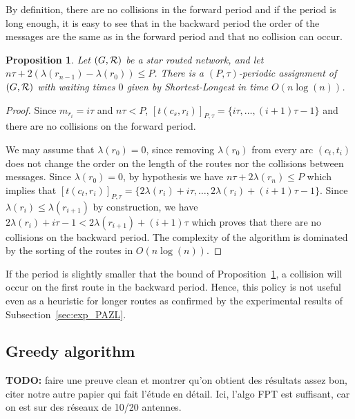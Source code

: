 \documentclass[10pt, conference, letterpaper]{IEEEtran}
\newtheorem{proposition}{Proposition}
\begin{document}
     By definition, there are no collisions in the forward period and if the period is long enough, 
     it is easy to see that in the backward period the order of the messages are the same as in the forward period and that no collision can occur. 
      
      
      \begin{proposition} Let $(G, {\cal R})$ be a star routed network, and let $n\tau + 2(\lambda(r_{n-1}) - \lambda(r_{0})) \leq P$. There is a $(P,\tau)$-periodic assignment of $(G, {\cal R})$ with waiting times $0$ given by Shortest-Longest in time $O(n\log(n))$.\label{prop:SL}
      \end{proposition}
      \begin{proof}
       Since $m_{r_i} = i\tau$ and $n\tau < P$, $[t(c_s,r_{i})]_{P,\tau} = \{i\tau,\dots, (i+1)\tau -1\}$ and there are no collisions on the forward period.
       
       We may assume that $\lambda(r_{0}) = 0$, since removing $\lambda(r_{0})$ from every arc $(c_t,t_i)$ does not change the order on the length of the routes nor the collisions between messages.
       Since $\lambda(r_{0}) = 0$, by hypothesis we have $n\tau + 2\lambda(r_{n}) \leq P$ which implies that
       $[t(c_t,r_{i})]_{P,\tau} = \{2 \lambda(r_{i}) + i\tau, \dots,  2 \lambda(r_{i}) + (i+1)\tau -1\}$.
       Since $ \lambda(r_{i}) \leq  \lambda(r_{i+1})$ by construction, we have  $2 \lambda(r_{i}) + i\tau -1 < 2 \lambda(r_{i+1}) + (i+1)\tau$ which proves that there are no collisions on the backward period. 
 The complexity of the algorithm is dominated by the sorting of the routes in $O(n\log(n))$. 
      \end{proof}

      If the period is slightly smaller that the bound of Proposition~\ref{prop:SL}, a collision will occur on the first route in the backward period. Hence, this policy is not useful even as a heuristic for longer routes as confirmed by the experimental results of Subsection~\ref{sec:exp_PAZL}. 

   
    \subsection{Greedy algorithm}
    
    \textbf{TODO:} faire une preuve clean et montrer qu'on obtient des résultats assez bon,
    citer notre autre papier qui fait l'étude en détail. Ici, l'algo FPT est suffisant, car 
    on est sur des réseaux de 10/20 antennes.
    
\end{document}
